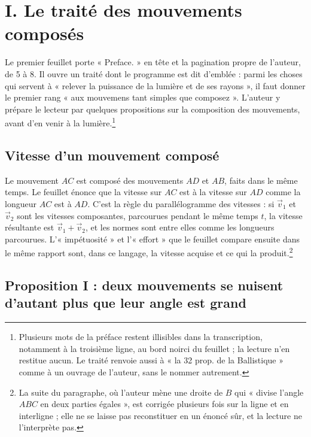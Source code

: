 \documentclass[11pt,a4paper]{article}
\begin{document}
\section*{I. Le traité des mouvements composés}

Le premier feuillet porte « Preface. » en tête et la pagination propre de
l'auteur, de 5 à 8. Il ouvre un traité dont le programme est dit d'emblée :
parmi les choses qui servent à « relever la puissance de la lumière et de ses
rayons », il faut donner le premier rang « aux mouvemens tant simples que
composez ». L'auteur y prépare le lecteur par quelques propositions sur la
composition des mouvements, avant d'en venir à la lumière.\footnote{Plusieurs
mots de la préface restent illisibles dans la transcription, notamment à la
troisième ligne, au bord noirci du feuillet ; la lecture n'en restitue aucun.
Le traité renvoie aussi à « la 32 prop. de la Ballistique » comme à un ouvrage
de l'auteur, sans le nommer autrement.}

\subsection*{Vitesse d'un mouvement composé}

Le mouvement \(AC\) est composé des mouvements \(AD\) et \(AB\), faits dans le
même temps. Le feuillet énonce que la vitesse sur \(AC\) est à la vitesse sur
\(AD\) comme la longueur \(AC\) est à \(AD\). C'est la règle du parallélogramme
des vitesses : si \(\vec v_1\) et \(\vec v_2\) sont les vitesses composantes,
parcourues pendant le même temps \(t\), la vitesse résultante est
\(\vec v_1+\vec v_2\), et les normes sont entre elles comme les longueurs
parcourues. L'« impétuosité » et l'« effort » que le feuillet compare ensuite
dans le même rapport sont, dans ce langage, la vitesse acquise et ce qui la
produit.\footnote{La suite du paragraphe, où l'auteur mène une droite de
\(B\) qui « divise l'angle \(ABC\) en deux parties égales », est corrigée
plusieurs fois sur la ligne et en interligne ; elle ne se laisse pas
reconstituer en un énoncé sûr, et la lecture ne l'interprète pas.}

\subsection*{Proposition I : deux mouvements se nuisent d'autant plus que leur angle est grand}
\end{document}
